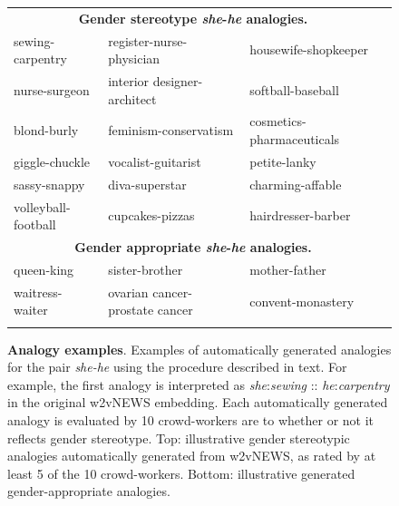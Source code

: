 \documentclass{article}
\begin{document}
\begin{figure}
\begin{tabular}{lllc}
\multicolumn{3}{c}{\bf{Gender stereotype \emph{she}-\emph{he} analogies.}}\\ 
{sewing-carpentry} & {register-nurse-physician } & {housewife-shopkeeper } \\
{nurse-surgeon} & {interior designer-architect} & {softball-baseball } \\
{blond-burly} & {feminism-conservatism } & {cosmetics-pharmaceuticals} \\
{giggle-chuckle} & {vocalist-guitarist} & {petite-lanky } \\
{sassy-snappy} & {diva-superstar} & {charming-affable } \\
{volleyball-football} & {cupcakes-pizzas } & {hairdresser-barber } \\[2ex]
\multicolumn{3}{c}{{\bf Gender appropriate \emph{she}-\emph{he} analogies.}}\\
{queen-king} & {sister-brother} & {mother-father} \\
{waitress-waiter} & {ovarian cancer-prostate cancer} & {convent-monastery} \\
\\\end{tabular}
\caption{\textbf{Analogy examples}. Examples of automatically generated analogies for the pair \emph{she-he} using the procedure described in text. For example, the first analogy is interpreted as \emph{she}:\emph{sewing} :: \emph{he}:\emph{carpentry} in the original w2vNEWS embedding. Each automatically generated analogy is evaluated by 10 crowd-workers are to whether or not it reflects gender stereotype. Top: illustrative gender stereotypic analogies automatically generated from w2vNEWS, as rated by at least 5 of the 10 crowd-workers. Bottom: illustrative generated gender-appropriate analogies.  }
\label{fig:analogy_examples}
\end{figure}
\end{document}
